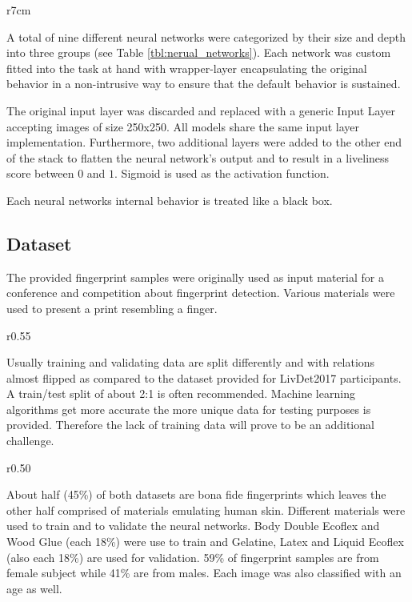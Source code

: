 \begin{wrapfigure}[13]{r}{7cm}
    
    \label{tbl:nerual_networks}
\end{wrapfigure}
\noindent
A total of nine different neural networks were categorized by their size and depth into three groups (see Table \ref{tbl:nerual_networks}).
Each network was custom fitted into the task at hand with wrapper-layer encapsulating the original behavior in a non-intrusive way to ensure that the default behavior is sustained.

\smallskip\noindent
The original input layer was discarded and replaced with a generic Input Layer accepting images of size 250x250. All models share the same input layer implementation.
Furthermore, two additional layers were added to the other end of the stack to flatten the neural network's output and to result in a liveliness score between $0$ and $1$.
Sigmoid is used as the activation function.

\noindent
Each neural networks internal behavior is treated like a black box.



\subsection{Dataset}
The provided fingerprint samples were originally used as input material for a conference and competition about fingerprint detection. Various materials were used to present a print resembling a finger.

\begin{wrapfigure}[6]{r}{0.55\textwidth}
    \vspace{-5mm}    
    
\end{wrapfigure}

\noindent
Usually training and validating data are split differently and with relations almost flipped as compared to the dataset provided for LivDet2017 participants.
A train/test split of about 2:1 is often recommended.
Machine learning algorithms get more accurate the more unique data for testing purposes is provided.
Therefore the lack of training data will prove to be an additional challenge.

\begin{wrapfigure}[7]{r}{0.50\textwidth}
    \vspace{-5mm}
    
\end{wrapfigure}

\smallskip\noindent
About half (45\%) of both datasets are bona fide fingerprints which leaves the other half comprised of materials emulating human skin.
Different materials were used to train and to validate the neural networks.
Body Double Ecoflex and Wood Glue (each 18\%) were use to train and Gelatine, Latex and Liquid Ecoflex (also each 18\%) are used for validation.
59\% of fingerprint samples are from female subject while 41\% are from males.
Each image was also classified with an age as well.

